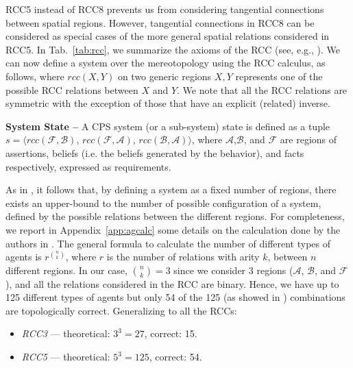\documentclass[runningheads]{llncs}
\newcommand{\assertionRegion}{\mathcal{A}}
\newcommand{\beliefRegion}{\mathcal{B}}
\newcommand{\factRegion}{\mathcal{F}}
\newcommand{\rcc}{rcc}
\begin{document}
RCC5 instead of RCC8 prevents us from considering tangential connections
between spatial regions. However, tangential connections in RCC8 can be
considered as special cases of the more general spatial relations considered in
RCC5.
In Tab.~\ref{tab:rcc}, we summarize the axioms of the RCC (see, e.g., \autocite{Grutter2008rcc}).  We can now define a system
over the mereotopology using the RCC calculus, as follows, where $\rcc(X,Y)$ on
two generic regions $X,Y$ represents one of the possible RCC relations between
$X$ and $Y$. We note that all the RCC relations are symmetric with the exception
of those that have an explicit (related) inverse.

\begin{definition}{\bf System State --}\label{def:opsystem}
	A CPS system (or a sub-system) state is defined as a tuple
	$s=\langle\rcc(\factRegion,\beliefRegion),\,\rcc(\factRegion,\assertionRegion),\,\rcc(\beliefRegion,\assertionRegion)\rangle$,
	where $\assertionRegion$,$\beliefRegion$, and $\factRegion$ are regions of
	assertions, beliefs (i.e. the beliefs generated by the behavior), and
	facts respectively, expressed as requirements.
\end{definition}

As in \autocite{Santaca2016abf}, it follows that, by defining
a system as a fixed number of regions, there exists
an upper-bound to the number of possible configuration of a system, defined by
the possible relations between the different regions.
For completeness, we report in Appendix~\ref{app:agcalc}
some details on the calculation done by the authors in \autocite{Santaca2016abf}.
The general formula to calculate the number of different types of agents is
$r^{\binom{n}{k}}$, where $r$ is the number of relations with arity $k$,
between $n$ different regions. In our case, $\binom{n}{k}=3$ since we consider $3$ regions 
($\assertionRegion$, $\beliefRegion$, and $\factRegion$), and all the relations
considered in the RCC are binary.  Hence, we have up to 125
different types of agents but only 54 of the 125 (as showed in
\autocite{improvingRCC}) combinations are topologically correct. 
Generalizing to all the RCCs:

\begin{itemize}%
\item \emph{RCC3} --- theoretical: $3^3=27$,  correct: 15.
\item \emph{RCC5} --- theoretical: $5^3=125$, correct: 54.
\end{itemize}
\end{document}
